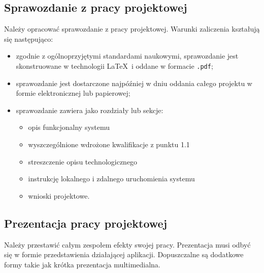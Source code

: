 \documentclass{article}
\begin{document}
	\subsection{Sprawozdanie z pracy projektowej}
	Należy opracować sprawozdanie z pracy projektowej. Warunki zaliczenia kształują się następująco:
	\begin{itemize}
		\item zgodnie z ogólnoprzyjętymi standardami naukowymi, sprawozdanie jest skonstruowane w technologii \LaTeX \ i oddane w formacie \texttt{.pdf};
		\item sprawozdanie jest dostarczone najpóźniej w dniu oddania całego projektu w formie elektronicznej lub papierowej;
		\item sprawozdanie zawiera jako rozdziały lub sekcje:
		\begin{itemize}
			\item opis funkcjonalny systemu
			\item wyszczególnione wdrożone kwalifikacje z punktu 1.1
			\item streszczenie opisu technologicznego
			\item instrukcję lokalnego i zdalnego uruchomienia systemu
			\item wnioski projektowe.
		\end{itemize}
	\end{itemize}	
	
	\subsection{Prezentacja pracy projektowej}
	Należy przestawić całym zespołem efekty swojej pracy. Prezentacja musi odbyć się w formie przedstawienia działającej aplikacji. Dopuszczalne są dodatkowe formy takie jak krótka prezentacja multimedialna.
	
\end{document}
